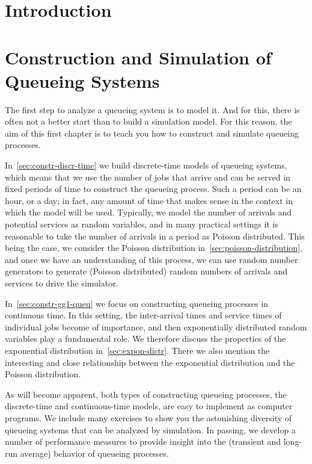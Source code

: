 \mainmatter

\chapter{Introduction}
\label{cha:introduction}




\chapter{Construction and Simulation of Queueing Systems}
\label{cha:single-stat-queu}


The first step to analyze a queueing system is to model it.
And for this, there is often not a better start than to build a simulation model.
For this reason, the aim of  this first chapter is to teach you how to construct and simulate queueing processes.

In~\cref{sec:constr-discr-time} we build discrete-time models of queueing systems, which means that we use the number of jobs that arrive and can be served in fixed periods of time to construct the queueing process.
Such a period can be an hour, or a day; in fact, any amount of time that makes sense in the context in which the model will be used.
Typically, we model the number of arrivals and potential services as random variables, and in many practical settings it is reasonable to take the number of arrivals in a period as Poisson distributed.
This being the case, we consider the Poisson distribution in~\cref{sec:poisson-distribution}, and once we have an understanding of this process, we can use random number generators to generate (Poisson distributed) random numbers of arrivals and services to drive the simulator.


In~\cref{sec:constr-gg1-queu} we focus on constructing queueing processes in continuous time.
In this setting, the inter-arrival times and service times of individual jobs become of importance, and then exponentially distributed random variables play a fundamental role.
We therefore discuss the properties of the exponential distribution in~\cref{sec:expon-distr}.
There we also mention the interesting and close relationship between the exponential distribution and the Poisson distribution.

As will become apparent, both types of constructing queueing processes, the discrete-time and continuous-time models, are easy to implement as computer programs.
We include many exercises to show you the astonishing diversity of queueing systems that can be analyzed by simulation.
In passing, we develop a number of performance measures to provide insight into the (transient and long-run average) behavior of queueing processes.


